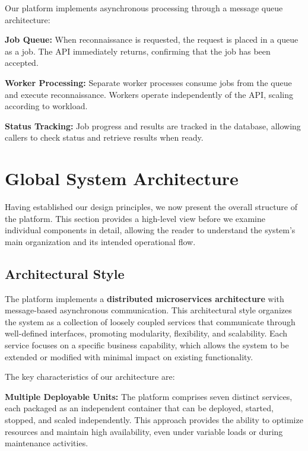 \documentclass[a4paper,12pt]{report}
\begin{document}
Our platform implements asynchronous processing through a message queue architecture:\hfill \break

\textbf{Job Queue:} When reconnaissance is requested, the request is placed in a queue as a job. The API immediately returns, confirming that the job has been accepted.\hfill \break

\textbf{Worker Processing:} Separate worker processes consume jobs from the queue and execute reconnaissance. Workers operate independently of the API, scaling according to workload.\hfill \break

\textbf{Status Tracking:} Job progress and results are tracked in the database, allowing callers to check status and retrieve results when ready.\hfill \break

\section{Global System Architecture}

Having established our design principles, we now present the overall structure of the platform. This section provides a high-level view before we examine individual components in detail, allowing the reader to understand the system's main organization and its intended operational flow.

\subsection{Architectural Style}

The platform implements a \textbf{distributed microservices architecture}\cite{microservices_arch} with message-based asynchronous communication. This architectural style organizes the system as a collection of loosely coupled services that communicate through well-defined interfaces, promoting modularity, flexibility, and scalability. Each service focuses on a specific business capability, which allows the system to be extended or modified with minimal impact on existing functionality.\hfill \break

The key characteristics of our architecture are:\hfill \break

\textbf{Multiple Deployable Units:} The platform comprises seven distinct services, each packaged as an independent container that can be deployed, started, stopped, and scaled independently. This approach provides the ability to optimize resources and maintain high availability, even under variable loads or during maintenance activities.\hfill \break
\end{document}
